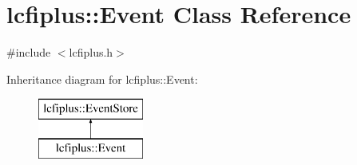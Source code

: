 \section{lcfiplus\-:\-:Event Class Reference}
\label{classlcfiplus_1_1Event}


{\ttfamily \#include $<$lcfiplus.\-h$>$}

Inheritance diagram for lcfiplus\-:\-:Event\-:\begin{figure}[H]
\begin{center}
\leavevmode
\includegraphics[height=2.000000cm]{classlcfiplus_1_1Event}
\end{center}
\end{figure}

